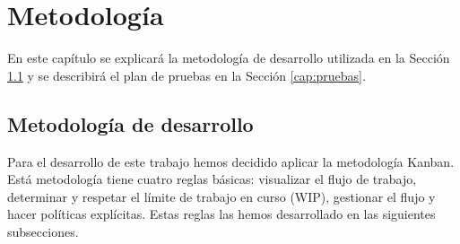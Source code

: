 \chapter{Metodología}
\label{cap:metodologia}
En este capítulo se explicará la metodología de desarrollo utilizada en la Sección \ref{cap:Kanban} y se describirá el plan de pruebas en la Sección \ref{cap:pruebas}.
\section{Metodología de desarrollo}
\label{cap:Kanban}
Para el desarrollo de este trabajo hemos decidido aplicar la metodología Kanban. Está metodología tiene cuatro reglas básicas: visualizar el flujo de trabajo, determinar y respetar el límite de trabajo en curso (WIP), gestionar el flujo y hacer políticas explícitas. Estas reglas las hemos desarrollado en las siguientes subsecciones.

